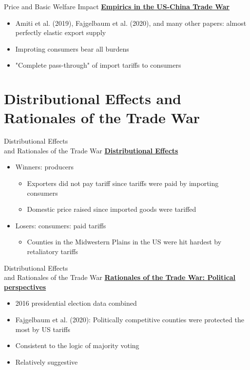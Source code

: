 \documentclass{beamer}
\begin{document}
\begin{frame}{Price and Basic Welfare Impact}
    \underline{\textbf{Empirics in the US-China Trade War}}
    \begin{itemize}
        \item Amiti et al. (2019), Fajgelbaum et al. (2020), and many other papers: 
        almost {\color{red}perfectly elastic} export supply
        \item Improting consumers bear all burdens 
        \item {\color{red}"Complete pass-through"} of import tariffs to consumers
    \end{itemize}
\end{frame}

\section{Distributional Effects and Rationales of the Trade War}
\begin{frame}{Distributional Effects \\ and Rationales of the Trade War}
\underline{\textbf{Distributional Effects}}
\begin{itemize}
    \item Winners: producers
    \begin{itemize}
        \item Exporters did {\color{red}not} pay tariff since tariffs were paid by importing consumers
        \item {\color{red}Domestic price raised} since imported goods were tariffed
    \end{itemize}
    \item Losers: consumers: paid tariffs
    \begin{itemize}
        \item Counties in the Midwestern Plains in the US were hit hardest by retaliatory tariffs
    \end{itemize}
\end{itemize}
\end{frame}

\begin{frame}{Distributional Effects \\ and Rationales of the Trade War}
\underline{\textbf{Rationales of the Trade War: {\color{red}Political} perspectives}}
\begin{itemize}
    \item 2016 presidential election data combined
    \item Fajgelbaum et al. (2020): {\color{red}Politically competitive} counties were protected the most by US tariffs
    \item Consistent to the logic of {\color{red}majority voting}
    \item Relatively suggestive
\end{itemize}
\end{frame}
\end{document}
